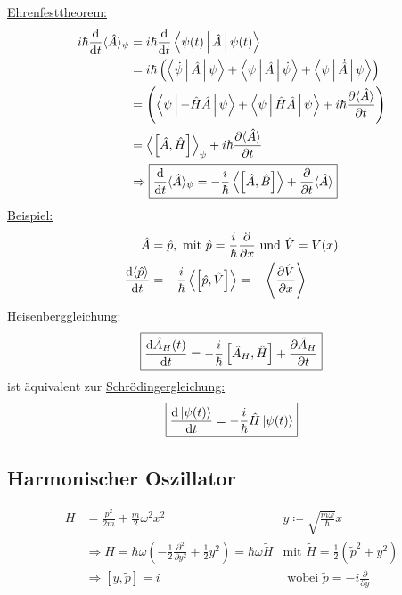 	\underline{Ehrenfesttheorem:}
		\begin{align*}
			i \hbar \frac{\mathrm{d}}{\mathrm{d} t} \langle \hat{A} \rangle_\psi
			&= i \hbar \frac{\mathrm{d}}{\mathrm{d} t} \Braket{\psi(t) | \hat{A} | \psi(t)} \\ 
			&= i \hbar \left( \Braket{\dot{\psi} | \hat{A} | \psi} + \Braket{\psi | \hat{A} | \dot{\psi}} + \Braket{\psi | \dot{\hat{A}} | \psi} \right) \\ 
			&= \left( \Braket{\psi | - \hat{H} \hat{A} | \psi} + \Braket{\psi | \hat{H} \hat{A} | \psi} + i\hbar \frac{\partial \langle {\hat{A}} \rangle}{\partial t} 
			\right) \\ 
			&= \left\langle {\left[\hat{A} , \hat{H} \right]} \right\rangle_\psi + i\hbar \frac{\partial \langle {\hat{A}} \rangle}{\partial t} 		\\
			&\Rightarrow \boxed{\frac{\mathrm{d}}{\mathrm{d} t} \langle {\hat{A}} \rangle_\psi = -\frac{i}{\hbar} \left\langle {\left[ \hat{A} , \hat{B} \right]} \right\rangle + \frac{\partial}{\partial t} \langle {\hat{A}} \rangle}	
		\end{align*} %
	\underline{Beispiel:}
		\begin{align*}
			\hat{A} &= \hat{p} , \text{~mit~} \hat{p} = \frac{i}{\hbar} \frac{\partial}{\partial x} \text{~und~}
			\hat{V} = V(x) \\
			\frac{\mathrm{d} \langle {\hat{p}} \rangle}{\mathrm{d} t} &=
			- \frac{i}{\hbar} \left\langle {\left[ \hat{p}, \hat{V}\right]} \right\rangle = - \left\langle {\frac{\partial \hat{V}}{\partial x}} \right\rangle 
		\end{align*}
	\underline{Heisenberggleichung:}
		\begin{align*}
			\boxed{\frac{\mathrm{d} \hat{A}_H(t)}{\mathrm{d} t}
					= - \frac{i}{\hbar} \left[ \hat{A}_H , \hat{H}\right]
					+ \frac{\partial \hat{A}_H}{\partial t}	}
		\end{align*}
	ist äquivalent zur \underline{Schrödingergleichung:}
		\begin{equation*}
			\boxed{\frac{\mathrm{d} \ket{\psi(t)}}{\mathrm{d} t} =
					- \frac{i}{\hbar} \hat{H} \ket{\psi(t)}
					}
		\end{equation*}
	\subsection{Harmonischer Oszillator}
		\begin{align*}
			H &= \frac{p^2}{2m} + \frac{m}{2} \omega^2 x^2 
			&y\coloneqq \sqrt{\frac{m \omega}{\hbar}} x \\
			&\Rightarrow H 
			= \hbar \omega \left(- \frac{1}{2} \frac{\partial^2}{\partial y^2} 
			+ \frac{1}{2} y^2\right)
			= \hbar \omega \tilde{H} 
			&\text{mit~} \tilde{H} = \frac{1}{2} \left(\tilde{p}^2 + y^2\right)\\
			&\Rightarrow \left[ y, \tilde{p}\right] = i 
			&\text{~wobei~} \tilde{p} =-i \frac{\partial}{\partial y} \\
		\end{align*} %

